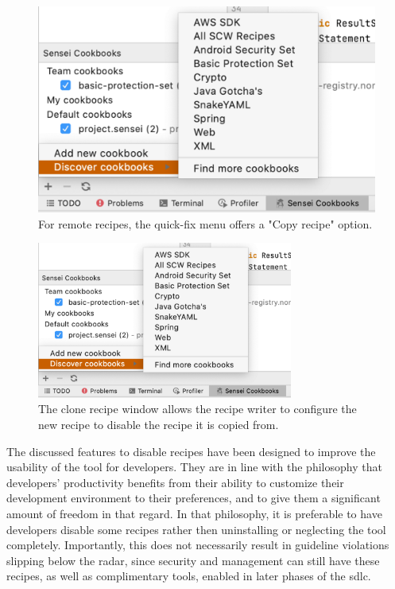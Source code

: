 \begin{figure}
  \centering
  \includegraphics[width=\textwidth,page=4]{04-tools/figures/figures1.pdf}
  \caption[Copy recipe option in the quick-fix menu]{For remote recipes, the quick-fix menu offers a "Copy recipe" option.}
  \label{fig:copyrecipe} 
\end{figure}

\begin{figure}
  \centering
  \includegraphics[width=0.75\textwidth,page=2]{04-tools/figures/figures1.pdf}
  \caption[Clone recipe window]{The clone recipe window allows the recipe writer to configure the new recipe to disable the recipe it is copied from.}
  \label{fig:clonewindow} 
\end{figure}

The discussed features to disable recipes have been designed to improve the usability of the tool for developers.
They are in line with the philosophy that developers' productivity benefits from their ability to customize their development environment to their preferences, and to give them a significant amount of freedom in that regard.
In that philosophy, it is preferable to have developers disable some recipes rather then uninstalling or neglecting the tool completely.
Importantly, this does not necessarily result in guideline violations slipping below the radar, since security and management can still have these recipes, as well as complimentary tools, enabled in later phases of the \gls{sdlc}.

